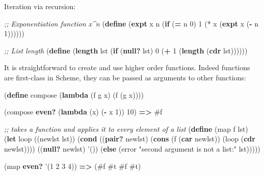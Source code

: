 \documentclass[12pt,a4paper,oneside,openright]{book}
\newenvironment{Shaded}{\begin{snugshade}}{\end{snugshade}}
\newcommand{\KeywordTok}[1]{\textcolor[rgb]{0.13,0.29,0.53}{\textbf{{#1}}}}
\newcommand{\DecValTok}[1]{\textcolor[rgb]{0.00,0.00,0.81}{{#1}}}
\newcommand{\StringTok}[1]{\textcolor[rgb]{0.31,0.60,0.02}{{#1}}}
\newcommand{\CommentTok}[1]{\textcolor[rgb]{0.56,0.35,0.01}{\textit{{#1}}}}
\newcommand{\FunctionTok}[1]{\textcolor[rgb]{0.00,0.00,0.00}{{#1}}}
\newcommand{\NormalTok}[1]{{#1}}
\begin{document}
Iteration via recursion:

\begin{Shaded}
\begin{Highlighting}[]
    \CommentTok{;; Exponentiation function x^n}
    \NormalTok{(}\KeywordTok{define}\FunctionTok{ }\NormalTok{(}\KeywordTok{expt} \NormalTok{x n}
      \NormalTok{(}\KeywordTok{if} \NormalTok{(}\KeywordTok{=} \NormalTok{n }\DecValTok{0}\NormalTok{)}
          \DecValTok{1}
          \NormalTok{(* x (}\KeywordTok{expt} \NormalTok{x (}\KeywordTok{-} \NormalTok{n }\DecValTok{1}\NormalTok{))))))}

    \CommentTok{;; List length}
    \NormalTok{(}\KeywordTok{define}\FunctionTok{ }\NormalTok{(}\KeywordTok{length} \NormalTok{lst}
      \NormalTok{(}\KeywordTok{if} \NormalTok{(}\KeywordTok{null?} \NormalTok{lst)}
          \DecValTok{0}
          \NormalTok{(}\KeywordTok{+} \DecValTok{1} \NormalTok{(}\KeywordTok{length} \NormalTok{(}\KeywordTok{cdr} \NormalTok{lst))))))}
\end{Highlighting}
\end{Shaded}

It is straightforward to create and use higher order functions. Indeed
functions are first-class in Scheme, they can be passed as arguments to
other functions:

\begin{Shaded}
\begin{Highlighting}[]
    \NormalTok{(}\KeywordTok{define}\FunctionTok{ compose}
      \NormalTok{(}\KeywordTok{lambda} \NormalTok{(f g x)}
        \NormalTok{(f (g x))))}

    \NormalTok{(compose }\KeywordTok{even?} \NormalTok{(}\KeywordTok{lambda} \NormalTok{(x) (}\KeywordTok{-} \NormalTok{x }\DecValTok{1}\NormalTok{)) }\DecValTok{10}\NormalTok{)   }\KeywordTok{=>} \DecValTok{#f}

    \CommentTok{;; takes a function and applies it to every element of a list}
    \NormalTok{(}\KeywordTok{define}\FunctionTok{ }\NormalTok{(map f lst)}
      \NormalTok{(}\KeywordTok{let} \NormalTok{loop ((newlst lst))}
        \NormalTok{(}\KeywordTok{cond} \NormalTok{((}\KeywordTok{pair?} \NormalTok{newlst)}
          \NormalTok{(}\KeywordTok{cons} \NormalTok{(f (}\KeywordTok{car} \NormalTok{newlst)) (loop (}\KeywordTok{cdr} \NormalTok{newlst))))}
         \NormalTok{((}\KeywordTok{null?} \NormalTok{newlst)}
          \NormalTok{'())}
         \NormalTok{(}\KeywordTok{else}
          \NormalTok{(error }\StringTok{"second argument is not a list:"}  \NormalTok{lst)))))}

    \NormalTok{(map }\KeywordTok{even?} \NormalTok{'(}\DecValTok{1} \DecValTok{2} \DecValTok{3} \DecValTok{4}\NormalTok{))        }\KeywordTok{=>} \NormalTok{(}\DecValTok{#f} \DecValTok{#t} \DecValTok{#f} \DecValTok{#t}\NormalTok{)}
\end{Highlighting}
\end{Shaded}
\end{document}

